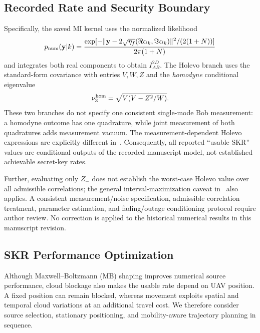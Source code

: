 \documentclass[conference,a4paper]{IEEEtran}
\begin{document}
\subsection{Recorded Rate and Security Boundary}
\label{sec:security}
Specifically, the saved MI kernel uses the normalized likelihood
\[
 p_{\rm num}(\mathbf y|k)=\frac{
 \exp[-\|\mathbf y-2\sqrt{\eta_f}(\Re\alpha_k,\Im\alpha_k)\|^2/
                 (2(1+N))]}{2\pi(1+N)}
\]
and integrates both real components to obtain $I_{AB}^{2D}$.
The Holevo branch uses the standard-form covariance with entries
$V,W,Z$ and the \emph{homodyne} conditional eigenvalue
\[
 \nu_3^{\rm hom}=\sqrt{V(V-Z^2/W)}.
\]
These two branches do not specify one consistent single-mode Bob
measurement: a homodyne outcome has one quadrature, while joint
measurement of both quadratures adds measurement vacuum. The
measurement-dependent Holevo expressions are explicitly different
in~\cite{denys2021}. Consequently, all reported ``usable SKR'' values
are conditional outputs of the recorded manuscript model, not
established achievable secret-key rates.

Further, evaluating only $Z_-$ does not establish the worst-case
Holevo value over all admissible correlations; the general
interval-maximization caveat in~\cite[Sec.~4, footnotes 11--12]{denys2021}
also applies. A consistent measurement/noise specification, admissible
correlation treatment, parameter estimation, and fading/outage
conditioning protocol require author review. No correction is applied
to the historical numerical results in this manuscript revision.


\subsection{SKR Performance Optimization}
\label{sec:optimization}
\label{sec:method}
Although Maxwell--Boltzmann (MB) shaping improves numerical source
performance, cloud blockage also makes the usable rate depend on UAV
position. A fixed position can remain blocked, whereas movement exploits
spatial and temporal cloud variations at an additional travel cost.
We therefore consider source selection, stationary positioning, and
mobility-aware trajectory planning in sequence.
\end{document}
